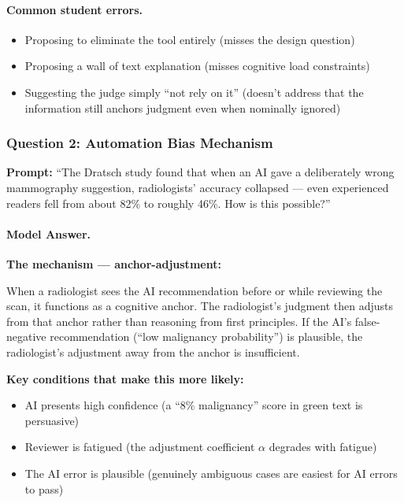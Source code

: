 \paragraph{Common student errors.}
\begin{itemize}
    \item Proposing to eliminate the tool entirely (misses the design question)
    \item Proposing a wall of text explanation (misses cognitive load constraints)
    \item Suggesting the judge simply ``not rely on it'' (doesn't address that the information still anchors judgment even when nominally ignored)
\end{itemize}

\subsubsection{Question 2: Automation Bias Mechanism}

\textbf{Prompt:} ``The Dratsch study found that when an AI gave a deliberately wrong mammography suggestion, radiologists' accuracy collapsed --- even experienced readers fell from about 82\% to roughly 46\%. How is this possible?''

\paragraph{Model Answer.}

\textbf{The mechanism --- anchor-adjustment:}

When a radiologist sees the AI recommendation before or while reviewing the scan, it functions as a cognitive anchor. The radiologist's judgment then adjusts from that anchor rather than reasoning from first principles. If the AI's false-negative recommendation (``low malignancy probability'') is plausible, the radiologist's adjustment away from the anchor is insufficient.

\textbf{Key conditions that make this more likely:}
\begin{itemize}
    \item AI presents high confidence (a ``8\% malignancy'' score in green text is persuasive)
    \item Reviewer is fatigued (the adjustment coefficient $\alpha$ degrades with fatigue)
    \item The AI error is plausible (genuinely ambiguous cases are easiest for AI errors to pass)
\end{itemize}

